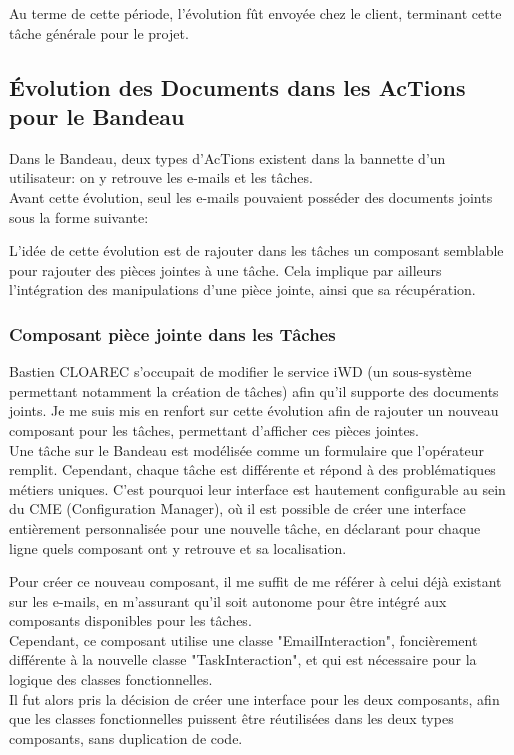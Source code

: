 \documentclass{rapport}
\begin{document}
Au terme de cette période, l'évolution fût envoyée chez le client, terminant cette tâche générale pour le projet.

\newpage
\subsection{Évolution des Documents dans les AcTions pour le Bandeau}

Dans le Bandeau, deux types d'AcTions existent dans la bannette d'un utilisateur: on y retrouve les e-mails et les tâches.\\
Avant cette évolution, seul les e-mails pouvaient posséder des documents joints sous la forme suivante:


L'idée de cette évolution est de rajouter dans les tâches un composant semblable pour rajouter des pièces jointes à une tâche. Cela implique par ailleurs l'intégration des manipulations d'une pièce jointe, ainsi que sa récupération.\\

\subsubsection{Composant pièce jointe dans les Tâches}

Bastien CLOAREC s'occupait de modifier le service iWD (un sous-système permettant notamment la création de tâches) afin qu'il supporte des documents joints. Je me suis mis en renfort sur cette évolution afin de rajouter un nouveau composant pour les tâches, permettant d'afficher ces pièces jointes.\\

Une tâche sur le Bandeau est modélisée comme un formulaire que l'opérateur remplit. Cependant, chaque tâche est différente et répond à des problématiques métiers uniques. C'est pourquoi leur interface est hautement configurable au sein du CME (Configuration Manager), où il est possible de créer une interface entièrement personnalisée pour une nouvelle tâche, en déclarant pour chaque ligne quels composant ont y retrouve et sa localisation.


Pour créer ce nouveau composant, il me suffit de me référer à celui déjà existant sur les e-mails, en m'assurant qu'il soit autonome pour être intégré aux composants disponibles pour les tâches.\\
Cependant, ce composant utilise une classe "EmailInteraction", foncièrement différente à la nouvelle classe "TaskInteraction", et qui est nécessaire pour la logique des classes fonctionnelles.\\
Il fut alors pris la décision de créer une interface pour les deux composants, afin que les classes fonctionnelles puissent être réutilisées dans les deux types composants, sans duplication de code.\\
\end{document}

